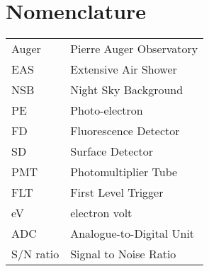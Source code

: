 \chapter*{Nomenclature}


\begin{tabular}{p{8em} p{30em}}
Auger & Pierre Auger Observatory \\
EAS & Extensive Air Shower \\
NSB & Night Sky Background \\
PE & Photo-electron \\
FD & Fluorescence Detector \\
SD & Surface Detector \\
PMT & Photomultiplier Tube \\
FLT & First Level Trigger \\
eV & electron volt \\
ADC & Analogue-to-Digital Unit \\
S/N ratio & Signal to Noise Ratio 
\end{tabular}